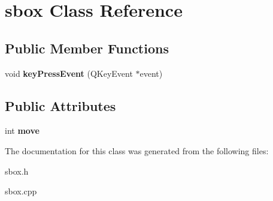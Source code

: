 \hypertarget{classsbox}{\section{sbox \-Class \-Reference}
\label{classsbox}
}
\subsection*{\-Public \-Member \-Functions}
\begin{DoxyCompactItemize}
\item 
\hypertarget{classsbox_a5bb0d187859986f15533cbf392705292}{void {\bfseries key\-Press\-Event} (\-Q\-Key\-Event $\ast$event)}\label{classsbox_a5bb0d187859986f15533cbf392705292}

\end{DoxyCompactItemize}
\subsection*{\-Public \-Attributes}
\begin{DoxyCompactItemize}
\item 
\hypertarget{classsbox_adc4daf1325d768f3607d224ec9da9a40}{int {\bfseries move}}\label{classsbox_adc4daf1325d768f3607d224ec9da9a40}

\end{DoxyCompactItemize}


\-The documentation for this class was generated from the following files\-:\begin{DoxyCompactItemize}
\item 
sbox.\-h\item 
sbox.\-cpp\end{DoxyCompactItemize}
